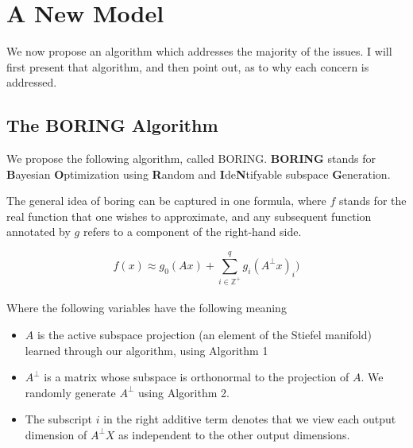 \chapter{A New Model}

\ifpdf
    \graphicspath{{Chapter4/Figs/Raster/}{Chapter4/Figs/PDF/}{Chapter4/Figs/}}
\else
    \graphicspath{{Chapter4/Figs/Vector/}{Chapter4/Figs/}}
\fi

We now propose an algorithm which addresses the majority of the issues.
I will first present that algorithm, and then point out, as to why each concern is addressed.

\section{The BORING Algorithm}

We propose the following algorithm, called BORING. \textbf{BORING} stands for \textbf{B}ayesian \textbf{O}ptimization using \textbf{R}andom and \textbf{I}de\textbf{N}tifyable subspace \textbf{G}eneration.

The general idea of boring can be captured in one formula, where $f$ stands for the real function that one wishes to approximate, and any subsequent function annotated by $g$ refers to a component of the right-hand side.

\begin{equation}
f(x) \approx g_0(A x) + \sum_{i \in \mathbb{Z}^+}^{q} g_i( A^{\bot} x)_i )
\label{eq:dimRedEquation}
\end{equation} \\

Where the following variables have the following meaning
\begin{itemize}
\item $A$ is the active subspace projection (an element of the Stiefel manifold) learned through our algorithm, using Algorithm 1
\item $A^{\bot}$ is a matrix whose subspace is orthonormal to the projection of $A$.
We randomly generate $A^{\bot}$ using Algorithm 2.
\item The subscript $i$ in the right additive term denotes that we view each output dimension of $A^{\bot} X$ as independent to the other output dimensions.

\end{itemize}

